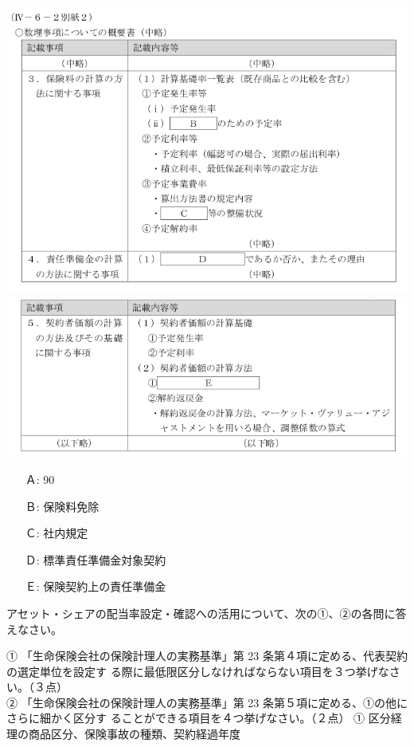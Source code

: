 \documentclass[report,gutter=10mm,fore-edge=10mm,uplatex,dvipdfmx]{jlreq}
\begin{document}
\includegraphics[scale=0.5]{./images/Prob2020-1-1-1-1.png}\\
\includegraphics[scale=0.5]{./images/Prob2020-1-1-1-2.png}

\answer{}

\begin{itemize}
\item[ Ａ:]  90 
\item[ Ｂ:]  保険料免除 
\item[ Ｃ:]  社内規定 
\item[ Ｄ:]  標準責任準備金対象契約 
\item[ Ｅ:]  保険契約上の責任準備金
\end{itemize}


アセット・シェアの配当率設定・確認への活用について、次の①、②の各問に答えなさい。\vspace{1zh}

\noindent ① 「生命保険会社の保険計理人の実務基準」第 23 条第４項に定める、代表契約の選定単位を設定す
る際に最低限区分しなければならない項目を３つ挙げなさい。（３点）\\
② 「生命保険会社の保険計理人の実務基準」第 23 条第５項に定める、①の他にさらに細かく区分す
ることができる項目を４つ挙げなさい。（２点）
\answer{}
① 区分経理の商品区分、保険事故の種類、契約経過年度
\end{document}
